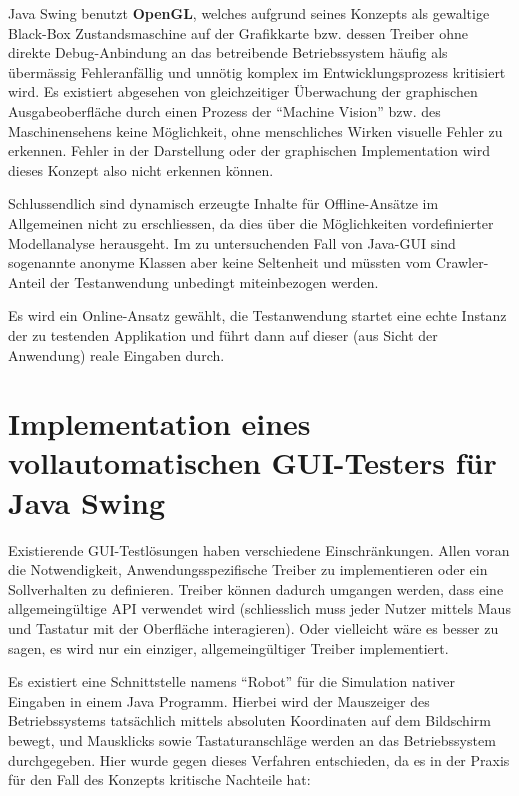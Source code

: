 Java Swing benutzt \textbf{OpenGL}\label{openglQQ}, welches aufgrund seines Konzepts als gewaltige
Black-Box Zustandsmaschine auf der Grafikkarte bzw. dessen Treiber
ohne direkte Debug-Anbindung an das betreibende Betriebssystem
häufig als übermässig Fehleranfällig und unnötig komplex im Entwicklungsprozess kritisiert wird.
Es existiert abgesehen von gleichzeitiger Überwachung der graphischen Ausgabeoberfläche
durch einen Prozess der ``Machine Vision'' bzw. des Maschinensehens keine Möglichkeit,
ohne menschliches Wirken visuelle Fehler zu erkennen. Fehler in der Darstellung oder
der graphischen Implementation wird dieses Konzept also nicht erkennen können.

Schlussendlich sind dynamisch erzeugte Inhalte für Offline-Ansätze im Allgemeinen
nicht zu erschliessen, da dies über die Möglichkeiten vordefinierter Modellanalyse herausgeht.
Im zu untersuchenden Fall von Java-GUI sind sogenannte anonyme Klassen aber keine
Seltenheit und müssten vom Crawler-Anteil der Testanwendung unbedingt miteinbezogen werden.

Es wird ein Online-Ansatz gewählt, die Testanwendung startet eine echte Instanz
der zu testenden Applikation und führt dann auf dieser (aus Sicht der Anwendung) reale
Eingaben durch.


\section{Implementation eines vollautomatischen GUI-Testers für Java Swing}\label{section:myfullautoguitest}


Existierende GUI-Testlösungen haben verschiedene Einschränkungen. Allen voran die
Notwendigkeit, Anwendungsspezifische Treiber zu implementieren oder ein Sollverhalten zu definieren.
Treiber können dadurch umgangen werden, dass eine allgemeingültige API verwendet wird (schliesslich 
muss jeder Nutzer mittels Maus und Tastatur mit der Oberfläche interagieren). Oder vielleicht
wäre es besser zu sagen, es wird nur ein einziger, allgemeingültiger Treiber implementiert.

Es existiert eine Schnittstelle namens ``Robot'' \cite{java7insel} für die Simulation nativer Eingaben
in einem Java Programm. Hierbei wird der Mauszeiger des Betriebssystems tatsächlich mittels
absoluten Koordinaten auf dem Bildschirm bewegt, und Mausklicks sowie Tastaturanschläge
werden an das Betriebssystem durchgegeben. Hier wurde gegen dieses Verfahren entschieden,
da es in der Praxis für den Fall des Konzepts kritische Nachteile hat:


